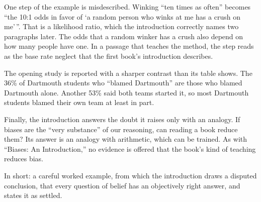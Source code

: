 \begin{afterword}
One step of the example is misdescribed. Winking ``ten times as often'' becomes ``the 10:1 odds in favor of `a random person who winks at me has a crush on me'\,''. That is a likelihood ratio, which the introduction correctly names two paragraphs later. The odds that a random winker has a crush also depend on how many people have one. In a passage that teaches the method, the step reads as the base rate neglect that the first book's introduction describes.

The opening study is reported with a sharper contrast than its table shows. The 36\% of Dartmouth students who ``blamed Dartmouth'' are those who blamed Dartmouth alone. Another 53\% said both teams started it, so most Dartmouth students blamed their own team at least in part.

Finally, the introduction answers the doubt it raises only with an analogy. If biases are the ``very substance'' of our reasoning, can reading a book reduce them? Its answer is an analogy with arithmetic, which can be trained. As with ``Biases: An Introduction,'' no evidence is offered that the book's kind of teaching reduces bias.

In short: a careful worked example, from which the introduction draws a disputed conclusion, that every question of belief has an objectively right answer, and states it as settled.
\end{afterword}
